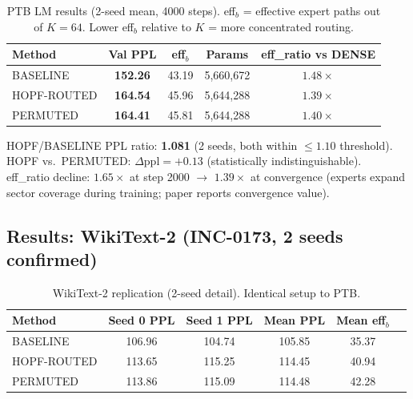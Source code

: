 \documentclass[11pt]{article}
\begin{document}
\begin{table}[h]
\centering
\caption{PTB LM results (2-seed mean, 4000 steps). eff$_b$ = effective expert paths
out of $K{=}64$. Lower eff$_b$ relative to $K$ = more concentrated routing.}
\label{tab:ptb}
\begin{tabular}{lcccc}
\toprule
Method        & Val PPL & eff$_b$ & Params    & eff\_ratio vs DENSE \\
\midrule
BASELINE      & \textbf{152.26} & 43.19 & 5,660,672 & $1.48\times$          \\
HOPF-ROUTED   & \textbf{164.54} & 45.96 & 5,644,288 & $\mathbf{1.39\times}$ \\
PERMUTED      & \textbf{164.41} & 45.81 & 5,644,288 & $1.40\times$          \\
\bottomrule
\end{tabular}
\end{table}

HOPF/BASELINE PPL ratio: \textbf{1.081} (2 seeds, both within $\le1.10$ threshold).\\
HOPF vs.\ PERMUTED: $\Delta\text{ppl} = +0.13$ (statistically indistinguishable).\\
eff\_ratio decline: $1.65\times$ at step 2000 $\to$ $1.39\times$ at convergence
(experts expand sector coverage during training; paper reports convergence value).

\subsection{Results: WikiText-2 (INC-0173, 2 seeds confirmed)}

\begin{table}[h]
\centering
\caption{WikiText-2 replication (2-seed detail). Identical setup to PTB.}
\label{tab:wt2}
\begin{tabular}{lccccc}
\toprule
Method & Seed 0 PPL & Seed 1 PPL & Mean PPL & Mean eff$_b$ \\
\midrule
BASELINE    & 106.96 & 104.74 & 105.85 & 35.37 \\
HOPF-ROUTED & 113.65 & 115.25 & 114.45 & 40.94 \\
PERMUTED    & 113.86 & 115.09 & 114.48 & 42.28 \\
\bottomrule
\end{tabular}
\end{table}
\end{document}
